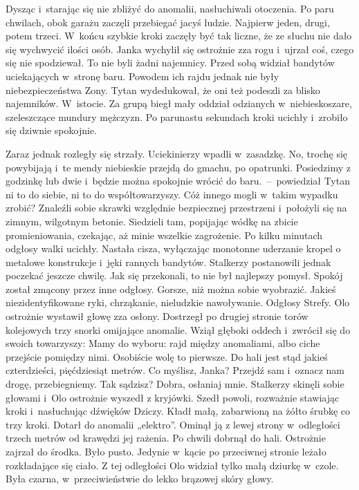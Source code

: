 \documentclass[../MAIN.tex]{subfiles}
\begin{document}
Dysząc i~starając się nie zbliżyć do anomalii, nasłuchiwali otoczenia. Po paru chwilach, obok garażu zaczęli przebiegać jacyś ludzie. Najpierw jeden, drugi, potem trzeci. W~końcu szybkie kroki zaczęły być tak liczne, że ze słuchu nie dało się wychwycić ilości osób. Janka wychylił się ostrożnie zza rogu i~ujrzał coś, czego się nie spodziewał. To nie byli żadni najemnicy. Przed sobą widział bandytów uciekających w~stronę baru. Powodem ich rajdu jednak nie były niebezpieczeństwa Zony. Tytan wydedukował, że oni też podeszli za blisko najemników. W~istocie. Za grupą biegł mały oddział odzianych w~niebieskoszare, szeleszczące mundury mężczyzn. Po parunastu sekundach kroki ucichły i~zrobiło się dziwnie spokojnie.%

Zaraz jednak rozległy się strzały. Uciekinierzy wpadli w~zasadzkę.
\sx No, trochę się powybijają i~te mendy niebieskie przejdą do gmachu, po opatrunki. Posiedzimy z godzinkę lub dwie i~będzie można spokojnie wrócić do baru.~--~powiedział Tytan ni to do siebie, ni to do współtowarzyszy.
\qm
Cóż innego mogli w~takim wypadku zrobić? Znaleźli sobie skrawki względnie bezpiecznej przestrzeni i~położyli się na zimnym, wilgotnym betonie. Siedzieli tam, popijając wódkę na zbicie promieniowania, czekając, aż minie wszelkie zagrożenie. Po kilku minutach odgłosy walki ucichły. Nastała cisza, wyłączając monotonne uderzanie kropel o metalowe konstrukcje i~jęki rannych bandytów. Stalkerzy postanowili jednak poczekać jeszcze chwilę. Jak się przekonali, to nie był najlepszy pomysł. Spokój został zmącony przez inne odgłosy. Gorsze, niż można sobie wyobrazić. Jakieś niezidentyfikowane ryki, chrząkanie, nieludzkie nawoływanie. Odgłosy Strefy. Olo ostrożnie wystawił głowę zza osłony. Dostrzegł po drugiej stronie torów kolejowych trzy snorki omijające anomalie. Wziął głęboki oddech i~zwrócił się do swoich towarzyszy:
\sx Mamy do wyboru: rajd między anomaliami, albo ciche przejście pomiędzy nimi. Osobiście wolę to pierwsze. Do hali jest stąd jakieś czterdzieści, pięćdziesiąt metrów. Co myślisz, Janka?
\xx Przejdź sam i~oznacz nam drogę, przebiegniemy.
\xx Tak sądzisz? Dobra, osłaniaj mnie.
\qm
Stalkerzy skinęli sobie głowami i~Olo ostrożnie wyszedł z kryjówki. Szedł powoli, rozważnie stawiając kroki i~nasłuchując dźwięków Dziczy. Kładł małą, zabarwioną na żółto śrubkę co trzy kroki. Dotarł do anomalii „elektro”. Ominął ją z lewej strony w~odległości trzech metrów od krawędzi jej rażenia. Po chwili dobrnął do hali. Ostrożnie zajrzał do środka. Było pusto. Jedynie w~kącie po przeciwnej stronie leżało rozkładające się ciało. Z tej odległości Olo widział tylko małą dziurkę w~czole. Była czarna, w~przeciwieństwie do lekko brązowej skóry głowy.
\end{document}

